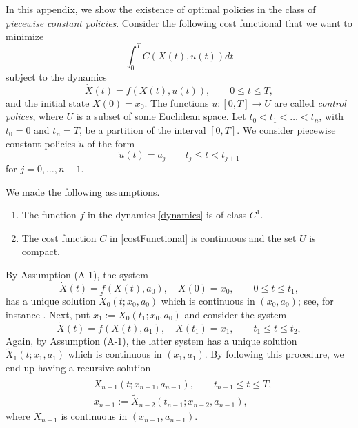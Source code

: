 In this appendix, we show the existence of optimal policies in the class of
{\it piecewise constant policies}. Consider the following cost functional that
we want to minimize
\begin{equation}\label{costFunctional}
  \int_0^T C(X(t),u(t)) dt
\end{equation}
subject to the dynamics
\begin{equation}\label{dynamics}
  \dot{X}(t) = f(X(t),u(t)),  \qquad    0\leq t \leq T,
\end{equation}
and the initial state $X(0)=x_0$. The functions $u:[0,T]\to U$ are called {\it
control polices}, where $U$ is a subset of some Euclidean space.
%
Let $t_0<t_1<\ldots <t_n$, with
$t_0=0$ and $t_n=T$, be a partition of the interval $[0,T]$.
We consider piecewise constant policies $\tilde{u}$ of the form
\begin{equation}\label{PieceConstCont}
  \tilde{u}(t) = a_j\qquad t_j\leq t < t_{j+1}
\end{equation}
 for $j=0,\ldots,n-1$.
\begin{assumptions}
    We made the following assumptions.
    \begin{enumerate}[({A}-1)]
        \item
            The function $f$ in the dynamics \eqref{dynamics} is of
            class $C^1$.
        \item
            The cost function $C$ in \eqref{costFunctional} is continuous and
            the set $U$ is compact.
    \end{enumerate}
\end{assumptions}
%

    By Assumption (A-1)\textbf{}, the system
\[
  \dot{X}(t) = f(X(t),a_0), \quad X(0)=x_0, \qquad    0\leq t \leq t_1,
\]
has a unique solution $\tilde{X}_0(t;x_0,a_0)$ which is continuous in
$(x_0,a_0)$; see, for instance \cite{Kong2014}.  Next, put $x_1:=\tilde{X}_0(t_1;x_0,a_0)$ and consider the system
\[
  \dot{X}(t) = f(X(t),a_1), \quad X(t_1)=x_1, \qquad    t_1\leq t \leq t_2,
\]
Again, by Assumption (A-1), the latter system has a unique solution
$\tilde{X}_1(t;x_1,a_1)$ which is
continuous in $(x_1,a_1)$. By following this procedure, we end up having a
recursive solution
\begin{equation*}
  \begin{aligned}
    & \tilde{X}_{n-1}(t;x_{n-1},a_{n-1}),
    \qquad t_{n-1}\leq t \leq T,\\
    & x_{n-1}:=\tilde{X}_{n-2}(t_{n-1};x_{n-2},a_{n-1}),
  \end{aligned}
\end{equation*}
where $\tilde{X}_{n-1}$ is continuous in $(x_{n-1},a_{n-1})$.


